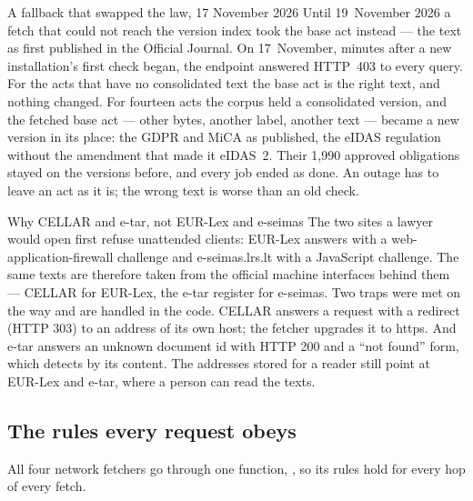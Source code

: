 \begin{lessonbox}{A fallback that swapped the law, 17 November 2026}
Until 19~November 2026 a fetch that could not reach the version index took the base act
instead --- the text as first published in the Official Journal. On 17~November, minutes after
a new installation's first check began, the endpoint answered HTTP~403 to every query. For
the acts that have no consolidated text the base act is the right text, and nothing changed.
For fourteen acts the corpus held a consolidated version, and the fetched base act --- other
bytes, another label, another text --- became a new version in its place: the GDPR and MiCA
as published, the eIDAS regulation without the amendment that made it eIDAS~2. Their 1,990
approved obligations stayed on the versions before, and every job ended as done. An
outage has to leave an act as it is; the wrong text is worse than an old check.
\end{lessonbox}

\begin{lessonbox}{Why CELLAR and e-tar, not EUR-Lex and e-seimas}
The two sites a lawyer would open first refuse unattended clients: EUR-Lex answers with a
web-application-firewall challenge and e-seimas.lrs.lt with a JavaScript challenge. The same
texts are therefore taken from the official machine interfaces behind them --- CELLAR for
EUR-Lex, the e-tar register for e-seimas. Two traps were met on the way and are handled in the
code. CELLAR answers a request with a redirect (HTTP 303) to an  address of its
own host; the fetcher upgrades it to https. And e-tar answers an unknown document id with
HTTP 200 and a \enquote{not found} form, which  detects by its content.
The addresses stored for a reader still point at EUR-Lex and e-tar, where a person can read
the texts.
\end{lessonbox}

\subsection{The rules every request obeys}\label{sec:corpus:egress}

All four network fetchers go through one function, , so its rules hold for
every hop of every fetch.


